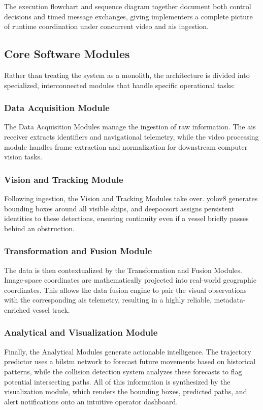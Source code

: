 The execution flowchart and sequence diagram together document both control decisions and timed message exchanges, giving implementers a complete picture of runtime coordination under concurrent video and \gls{ais} ingestion.

\subsection{Core Software Modules}
Rather than treating the system as a monolith, the architecture is divided into specialized, interconnected modules that handle specific operational tasks:

\subsubsection{Data Acquisition Module}
The Data Acquisition Modules manage the ingestion of raw information. The \gls{ais} receiver extracts identifiers and navigational telemetry, while the video processing module handles frame extraction and normalization for downstream computer vision tasks. 

\subsubsection{Vision and Tracking Module}
Following ingestion, the Vision and Tracking Modules take over. \gls{yolov8} generates bounding boxes around all visible ships, and \gls{deepocsort} assigns persistent identities to these detections, ensuring continuity even if a vessel briefly passes behind an obstruction.

\subsubsection{Transformation and Fusion Module}
The data is then contextualized by the Transformation and Fusion Modules. Image-space coordinates are mathematically projected into real-world geographic coordinates. This allows the data fusion engine to pair the visual observations with the corresponding \gls{ais} telemetry, resulting in a highly reliable, metadata-enriched vessel track.

\subsubsection{Analytical and Visualization Module}
Finally, the Analytical Modules generate actionable intelligence. The trajectory predictor uses a \gls{bilstm} network to forecast future movements based on historical patterns, while the collision detection system analyzes these forecasts to flag potential intersecting paths. All of this information is synthesized by the visualization module, which renders the bounding boxes, predicted paths, and alert notifications onto an intuitive operator dashboard.

